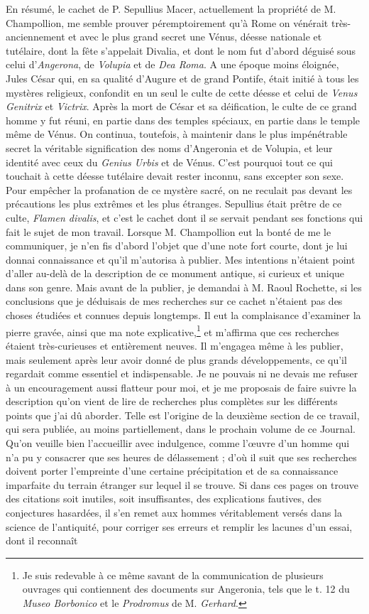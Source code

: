 \documentclass[a4paper, 11pt, oneside, polutonikogreek, french]{article}
\begin{document}
En résumé, le cachet de P. Sepullius Macer, actuellement la propriété de M. Champollion, me semble prouver péremptoirement qu'à Rome on vénérait très-anciennement et avec le plus grand secret une Vénus, déesse nationale et tutélaire, dont la fête s'appelait Divalia, et dont le nom fut d'abord déguisé sous celui d'\emph{Angerona}, de \emph{Volupia} et de \emph{Dea Roma}. A une époque moins éloignée, Jules César qui, en sa qualité d'Augure et de grand Pontife, était initié à tous les mystères religieux, confondit en un seul le culte de cette déesse et celui de \emph{Venus Genitrix} et \emph{Victrix}. Après la mort de César et sa déification, le culte de ce grand homme y fut réuni, en partie dans des temples spéciaux, en partie dans le temple même de Vénus. On continua, toutefois, à maintenir dans le plus impénétrable secret la véritable signification des noms d'Angeronia et de Volupia, et leur identité avec ceux du \emph{Genius Urbis} et de Vénus. C'est pourquoi tout ce qui touchait à cette déesse tutélaire devait rester inconnu, sans excepter son sexe. Pour empêcher la profanation de ce mystère sacré, on ne reculait pas devant les précautions les plus extrêmes et les plus étranges. Sepullius était prêtre de ce culte, \emph{Flamen divalis}, et c'est le cachet dont il se servait pendant ses fonctions qui fait le sujet de mon travail. Lorsque M. Champollion eut la bonté de me le communiquer, je n'en fis d'abord l'objet que d'une note fort courte, dont je lui donnai connaissance et qu'il m'autorisa à publier. Mes intentions n'étaient point d'aller au-delà de la description de ce monument antique, si curieux et unique dans son genre. Mais avant de la publier, je demandai à M. Raoul Rochette, si les conclusions que je déduisais de mes recherches sur ce cachet n'étaient pas des choses étudiées et connues depuis longtemps. Il eut la complaisance d'examiner la pierre gravée, ainsi que ma note explicative,\footnote{Je suis redevable à ce même savant de la communication de plusieurs ouvrages qui contiennent des documents sur Angeronia, tels que le t. 12 du \emph{Museo Borbonico} et le \emph{Prodromus} de M. \emph{Gerhard}.} et m'affirma que ces recherches étaient très-curieuses et entièrement neuves. Il m'engagea même à les publier, mais seulement après leur avoir donné de plus grands développements, ce qu'il regardait comme essentiel et indispensable. Je ne pouvais ni ne devais me refuser à un encouragement aussi flatteur pour moi, et je me proposais de faire suivre la description qu'on vient de lire de recherches plus complètes sur les différents points que j'ai dû aborder. Telle est l'origine de la deuxième section de ce travail, qui sera publiée, au moins partiellement, dans le prochain volume de ce Journal. Qu'on veuille bien l'accueillir avec indulgence, comme l'œuvre d'un homme qui n'a pu y consacrer que ses heures de délassement ; d'où il suit que ses recherches doivent porter l'empreinte d'une certaine précipitation et de sa connaissance imparfaite du terrain étranger sur lequel il se trouve. Si dans ces pages on trouve des citations soit inutiles, soit insuffisantes, des explications fautives, des conjectures hasardées, il s'en remet aux hommes véritablement versés dans la science de l'antiquité, pour corriger ses erreurs et remplir les lacunes d'un essai, dont il reconnaît 
\end{document}
